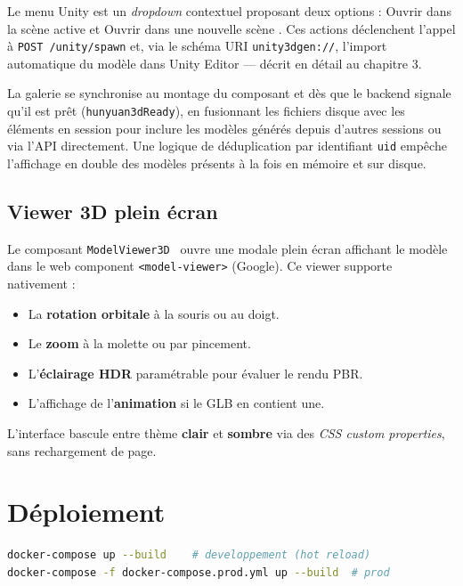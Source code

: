 \documentclass[12pt,a4paper,oneside]{report}
\begin{document}
Le menu Unity est un \textit{dropdown} contextuel proposant deux options :
\og Ouvrir dans la scène active \fg{} et \og Ouvrir dans une nouvelle
scène \fg{}. Ces actions déclenchent l'appel à \texttt{POST /unity/spawn}
et, via le schéma URI \texttt{unity3dgen://}, l'import automatique du
modèle dans Unity Editor --- décrit en détail au chapitre 3.

La galerie se synchronise au montage du composant et dès que le backend
signale qu'il est prêt (\texttt{hunyuan3dReady}), en fusionnant les
fichiers disque avec les éléments en session pour inclure les modèles
générés depuis d'autres sessions ou via l'API directement. Une logique de
déduplication par identifiant \texttt{uid} empêche l'affichage en double
des modèles présents à la fois en mémoire et sur disque.

\subsection{Viewer 3D plein écran}

Le composant \texttt{ModelViewer3D}~\cite{modelviewer} ouvre une modale plein écran
affichant le modèle dans le web component \texttt{<model-viewer>}
(Google). Ce viewer supporte nativement :

\begin{itemize}
  \item La \textbf{rotation orbitale} à la souris ou au doigt.
  \item Le \textbf{zoom} à la molette ou par pincement.
  \item L'\textbf{éclairage HDR} paramétrable pour évaluer le rendu PBR.
  \item L'affichage de l'\textbf{animation} si le GLB en contient une.
\end{itemize}

L'interface bascule entre thème \textbf{clair} et \textbf{sombre}
via des \textit{CSS custom properties}, sans rechargement de page.

\section{Déploiement}

\begin{lstlisting}[language=bash,
  caption={Déploiement complet via Docker Compose}]
docker-compose up --build    # developpement (hot reload)
docker-compose -f docker-compose.prod.yml up --build  # prod
\end{lstlisting}
\end{document}
